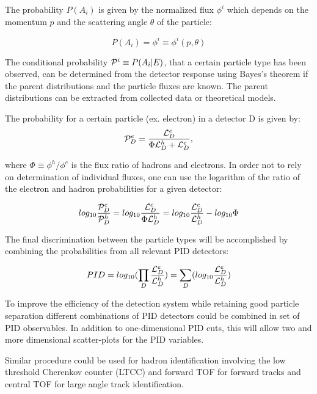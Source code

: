 The probability $P(A_i)$ is given by the normalized flux $\phi^i$ which depends on the 
momentum $p$ and the scattering angle $\theta$ of the particle:

\begin{equation}
P(A_i)= \phi^i \equiv   \phi^i(p,\theta)
\end{equation}

The conditional probability ${\cal P}^i\equiv P(A_i|E)$, that a certain particle 
type has been observed, can be determined from the detector response using Bayes's 
theorem if the parent distributions and the particle fluxes are known. The parent
distributions can be extracted from collected data or theoretical models.

The probability for a certain particle (ex. electron) in a detector D is given by:
\begin{equation}
{\cal P}_D^e = \frac{{\cal L}_D^e}{\Phi {\cal L}_D^h+{\cal L}_D^e},
\end{equation}

where $\Phi\equiv \phi^h/\phi^e$ is the flux ratio of hadrons and electrons. In order
not to rely on determination of individual fluxes, one can use the logarithm of the ratio
of the electron and hadron probabilities for a given detector:

\begin{equation}
log_{10} \frac{{\cal P}_D^e}{{\cal P}_D^h}= log_{10} 
\frac{{\cal L}_D^e}{\Phi {\cal L}_D^h}=log_{10}\frac{{\cal L}_D^e}{{\cal L}_D^h}-log_{10}\Phi
\end{equation}

The final discrimination between the particle types will be accomplished by combining 
the probabilities from all relevant PID detectors:

\begin{equation}
PID=log_{10}(\prod_D \frac{{\cal L}_D^e}{{\cal L}_D^h})=\sum_D (log_{10} 
\frac{{\cal L}_D^e}{{\cal L}_D^h})
\end{equation}

To improve the efficiency of the detection system while retaining good particle separation
different combinations of PID detectors could be combined in set of PID observables.
In addition to one-dimensional PID cuts, this will allow two and more dimensional 
scatter-plots for the PID variables.

Similar procedure could be used for hadron identification involving the low threshold
Cherenkov counter (LTCC) and forward TOF for forward tracks and central TOF for large angle
track identification.

